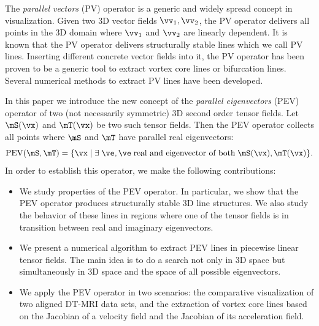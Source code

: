 
%
The {\em parallel vectors} (PV) operator \cite{Peikert1999} is a generic and
widely spread concept in visualization.
%
Given two 3D vector fields $ \vv_1, \vv_2$, the PV operator delivers all points
in the 3D domain where $ \vv_1$ and $\vv_2$ are linearly dependent.
%
It is known that the PV operator delivers structurally stable lines which we
call PV lines.
%
Inserting different concrete vector fields into it, the PV operator has been
proven to be a generic tool to extract vortex core lines or bifurcation lines.
%
Several numerical methods to extract PV lines have been developed.
%

%
In this paper we introduce the new concept of the {\em parallel eigenvectors}
(PEV) operator of two (not necessarily symmetric) 3D second order tensor fields.
%
Let $\mS(\vx)$ and $\mT(\vx)$ be two such tensor fields.
%
Then the PEV operator collects all points where $\mS$ and $\mT$ have parallel
real eigenvectors:
%
\begin{equation}
    \mbox{PEV}(\mS,\mT) = \{ \vx \;|\; \exists \;\ve,
        \ve \;\mbox{real and eigenvector of both} \;\mS(\vx),\mT(\vx) \}.
\end{equation}
%
In order to establish this operator, we make the following contributions:
%
\begin{itemize}
    \item
    We study properties of the PEV operator.
    In particular, we show that the PEV operator produces structurally stable 3D
    line structures.
    We also study the behavior of these lines in regions where one of the tensor
    fields is in transition between real and imaginary eigenvectors.
    \item
    We present a numerical algorithm to extract PEV lines in piecewise linear
    tensor fields.
    The main idea is to do a search not only in 3D space but simultaneously in
    3D space and the space of all possible eigenvectors.
    \item
    We apply the PEV operator in two scenarios:
    the comparative visualization of two aligned DT-MRI data sets,
    and the extraction of vortex core lines based on the Jacobian of a velocity
    field and the Jacobian of its acceleration field.
\end{itemize}
%

